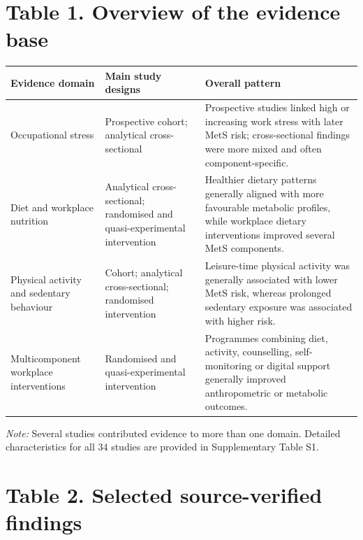 \section*{Table 1. Overview of the evidence base}

\begin{tabular}{p{} p{} p{}}
\toprule
Evidence domain & Main study designs & Overall pattern \\
\midrule
Occupational stress & Prospective cohort; analytical cross-sectional & Prospective studies linked high or increasing work stress with later MetS risk; cross-sectional findings were more mixed and often component-specific. \\
Diet and workplace nutrition & Analytical cross-sectional; randomised and quasi-experimental intervention & Healthier dietary patterns generally aligned with more favourable metabolic profiles, while workplace dietary interventions improved several MetS components. \\
Physical activity and sedentary behaviour & Cohort; analytical cross-sectional; randomised intervention & Leisure-time physical activity was generally associated with lower MetS risk, whereas prolonged sedentary exposure was associated with higher risk. \\
Multicomponent workplace interventions & Randomised and quasi-experimental intervention & Programmes combining diet, activity, counselling, self-monitoring or digital support generally improved anthropometric or metabolic outcomes. \\
\bottomrule
\end{tabular}

\vspace{0.5em}
\noindent\textit{Note:} Several studies contributed evidence to more than one domain. Detailed characteristics for all 34 studies are provided in Supplementary Table S1.
\section*{Table 2. Selected source-verified findings}

